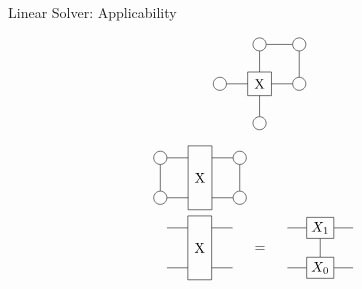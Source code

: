\begin{frame}{Linear Solver: Applicability}

    \begin{minipage}{.4\textwidth}
        \begin{equation}
            \vcenter{\hbox{  \begin{tikzpicture}[baseline=0.5]

                        \def \legLength { 0.8}
                        \def \radius {0.1}

                        \pgfmathsetmacro{\step}{2*\radius+ \legLength} %
                        \pgfmathsetmacro{\legpos}{\radius+\legLength} %

                        \node[draw, circle,radius=\radius] (L0) at (-1,0) {};

                        \draw (-0.3,0.3) -- (0.3,0.3) -- (0.3,-0.3) -- (-0.3,-0.3) -- cycle;

                        \node[draw, circle,radius=\radius] (R0) at (1,0) {};
                        \node[draw, circle,radius=\radius] (R1) at (1,1) {};

                        \node[draw, circle,radius=\radius] (U) at (0,1) {};
                        \node[draw, circle,radius=\radius] (D) at (0,-1) {};

                        \draw (R0) --   (R1);

                        \draw (L0) --   (-0.3,0);

                        \draw (R0) --   (0.3,0);
                        \draw (U) --   (0,0.3);
                        \draw (D) --   (0,-0.3);
                        \draw (R1) --   (U);

                        \node[draw=none] (C0) at (0,0) {X};
                    \end{tikzpicture} }}
        \end{equation}
    \end{minipage}
    \begin{minipage}{.59\textwidth}

        \begin{subequations}
            \begin{align}
                 & \figb          \\
                 & \figc =  \figd
            \end{align}
        \end{subequations}
    \end{minipage}

\end{frame}

